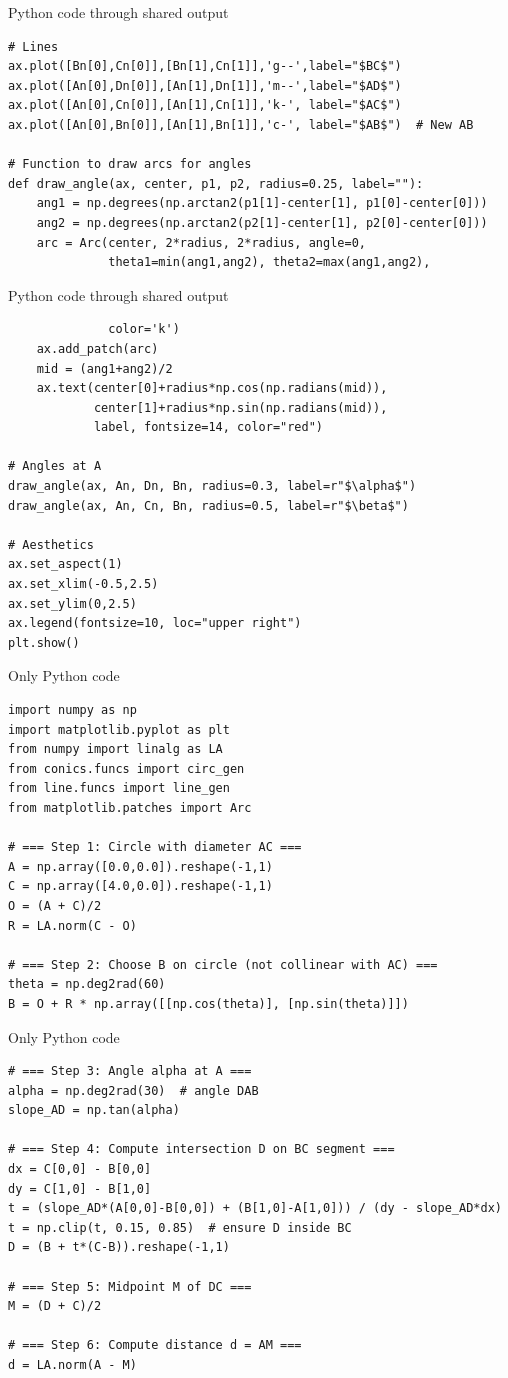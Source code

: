 \documentclass{beamer}
\begin{document}
\begin{frame}[fragile]{Python code through shared output}
\begin{lstlisting}
# Lines
ax.plot([Bn[0],Cn[0]],[Bn[1],Cn[1]],'g--',label="$BC$")
ax.plot([An[0],Dn[0]],[An[1],Dn[1]],'m--',label="$AD$")
ax.plot([An[0],Cn[0]],[An[1],Cn[1]],'k-', label="$AC$")
ax.plot([An[0],Bn[0]],[An[1],Bn[1]],'c-', label="$AB$")  # New AB

# Function to draw arcs for angles
def draw_angle(ax, center, p1, p2, radius=0.25, label=""):
    ang1 = np.degrees(np.arctan2(p1[1]-center[1], p1[0]-center[0]))
    ang2 = np.degrees(np.arctan2(p2[1]-center[1], p2[0]-center[0]))
    arc = Arc(center, 2*radius, 2*radius, angle=0,
              theta1=min(ang1,ang2), theta2=max(ang1,ang2),
    \end{lstlisting}
\end{frame}
\begin{frame}[fragile]{Python code through shared output}
\begin{lstlisting}
              color='k')
    ax.add_patch(arc)
    mid = (ang1+ang2)/2
    ax.text(center[0]+radius*np.cos(np.radians(mid)),
            center[1]+radius*np.sin(np.radians(mid)),
            label, fontsize=14, color="red")

# Angles at A
draw_angle(ax, An, Dn, Bn, radius=0.3, label=r"$\alpha$")
draw_angle(ax, An, Cn, Bn, radius=0.5, label=r"$\beta$")

# Aesthetics
ax.set_aspect(1)
ax.set_xlim(-0.5,2.5)
ax.set_ylim(0,2.5)
ax.legend(fontsize=10, loc="upper right")
plt.show()

 \end{lstlisting}
\end{frame}
\begin{frame}[fragile]{Only Python code}
\begin{lstlisting}
import numpy as np
import matplotlib.pyplot as plt
from numpy import linalg as LA
from conics.funcs import circ_gen
from line.funcs import line_gen
from matplotlib.patches import Arc

# === Step 1: Circle with diameter AC ===
A = np.array([0.0,0.0]).reshape(-1,1)
C = np.array([4.0,0.0]).reshape(-1,1)
O = (A + C)/2
R = LA.norm(C - O)

# === Step 2: Choose B on circle (not collinear with AC) ===
theta = np.deg2rad(60)
B = O + R * np.array([[np.cos(theta)], [np.sin(theta)]])
 \end{lstlisting}
\end{frame}
\begin{frame}[fragile]{Only Python code}
\begin{lstlisting}
# === Step 3: Angle alpha at A ===
alpha = np.deg2rad(30)  # angle DAB
slope_AD = np.tan(alpha)

# === Step 4: Compute intersection D on BC segment ===
dx = C[0,0] - B[0,0]
dy = C[1,0] - B[1,0]
t = (slope_AD*(A[0,0]-B[0,0]) + (B[1,0]-A[1,0])) / (dy - slope_AD*dx)
t = np.clip(t, 0.15, 0.85)  # ensure D inside BC
D = (B + t*(C-B)).reshape(-1,1)

# === Step 5: Midpoint M of DC ===
M = (D + C)/2

# === Step 6: Compute distance d = AM ===
d = LA.norm(A - M)
 \end{lstlisting}
\end{frame}
\end{document}
